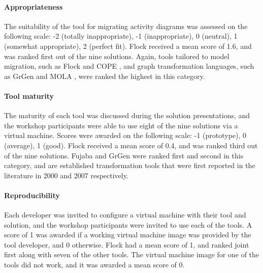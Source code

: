 \paragraph{Appropriateness} The suitability of the tool for migrating activity diagrams was assessed on the following scale: -2 (totally inappropriate), -1 (inappropriate), 0 (neutral), 1 (somewhat appropriate), 2 (perfect fit). Flock received a mean score of 1.6, and was ranked first out of the nine solutions. Again, tools tailored to model migration, such as Flock and COPE \cite{herrmannsdoerfer09cope}, and graph transformation languages, such as GrGen \cite{grgen} and MOLA \cite{mola}, were ranked the highest in this category.

\paragraph{Tool maturity} The maturity of each tool was discussed during the solution presentations, and the workshop participants were able to use eight of the nine solutions via a virtual machine. Scores were awarded on the following scale: -1 (prototype), 0 (average), 1 (good). Flock received a mean score of 0.4, and was ranked third out of the nine solutions. Fujaba \cite{fujaba} and GrGen \cite{grgen} were ranked first and second in this category, and are established transformation tools that were first reported in the literature in 2000 and 2007 respectively.

\paragraph{Reproducibility} Each developer was invited to configure a virtual machine with their tool and solution, and the workshop participants were invited to use each of the tools. A score of 1 was awarded if a working virtual machine image was provided by the tool developer, and 0 otherwise. Flock had a mean score of 1, and ranked joint first along with seven of the other tools. The virtual machine image for one of the tools did not work, and it was awarded a mean score of 0.

